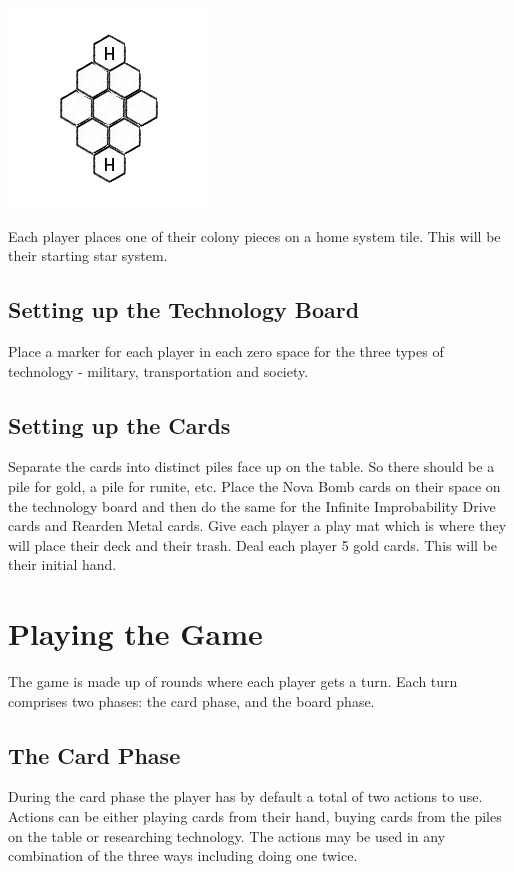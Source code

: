 \documentclass[12pt]{article} %
\begin{document}
\centerline{\includegraphics[scale=.75]{hexboard.jpg}}

Each player places one of their colony pieces on a home system tile.  This will be their starting star system.

\subsection{Setting up the Technology Board}

Place a marker for each player in each zero space for the three types of technology - military, transportation and society.

\subsection{Setting up the Cards}

Separate the cards into distinct piles face up on the table.  So there should be a pile for gold, a pile for runite, etc.  Place the Nova Bomb cards on their space on the technology board and then do the same for the Infinite Improbability Drive cards and Rearden Metal cards.  Give each player a play mat which is where they will place their deck and their trash.  Deal each player 5 gold cards.  This will be their initial hand.


\section{Playing the Game}

The game is made up of rounds where each player gets a turn.  Each turn comprises two phases: the card phase, and the board phase.

\subsection{The Card Phase}

During the card phase the player has by default a total of two actions to use.  Actions can be either playing cards from their hand, buying cards from the piles on the table or researching technology.  The actions may be used in any combination of the three ways including doing one twice.
\end{document}

